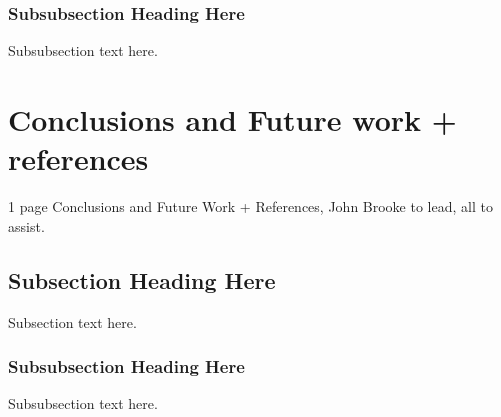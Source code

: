 \documentclass[conference]{IEEEtran}
\begin{document}
\subsubsection{Subsubsection Heading Here}
Subsubsection text here.

\section{Conclusions and Future work + references}
1 page Conclusions and Future Work + References, John Brooke to lead, all to assist. 
\subsection{Subsection Heading Here}
Subsection text here.
\subsubsection{Subsubsection Heading Here}
Subsubsection text here.


%
%



%
%
\end{document}
